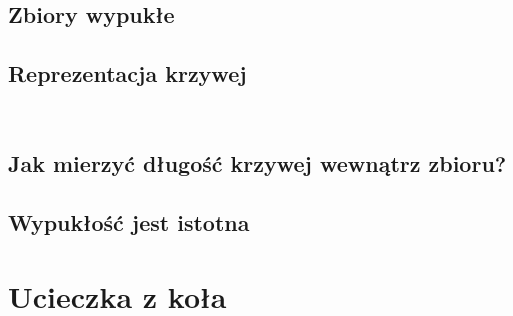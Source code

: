 \documentclass[aspectratio=169]{beamer}
\begin{document}
\subsection{Zbiory wypukłe}
{\convexExamplesTex}

\subsection{Reprezentacja krzywej}
{\curveRepresentationExampleTex}


\begin{frame}
\begin{columns}
  \begin{column}{0.5\textwidth}
    \begin{figure}
      {\curveComparisonLogoTex}
    \end{figure}
  \end{column}
  \begin{column}{0.5\textwidth}
    \begin{figure}
      {\curveComparisonAzimuthTex}
    \end{figure}
  \end{column}
\end{columns}
\end{frame}

\subsection{Jak mierzyć długość krzywej wewnątrz zbioru?}
{\lengthInsideExampleTex}
\subsection{Wypukłość jest istotna}
{\lengthInsideExampleNonconvexTex}

\section{Ucieczka z koła}

\begin{frame}
\begin{figure}
  	{\escapeFromCircleExTex}
\end{figure}
\end{frame}

\begin{frame}
\begin{columns}
\begin{column}{0.5\textwidth}
  \begin{figure}
    	{\escapeFromCircleLogoTex}
  \end{figure}
\end{column}
\begin{column}{0.5\textwidth}
  \begin{figure}
    	{\escapeFromCircleAzimuthTex}
  \end{figure}
\end{column}
\end{columns}
\end{frame}
\end{document}
